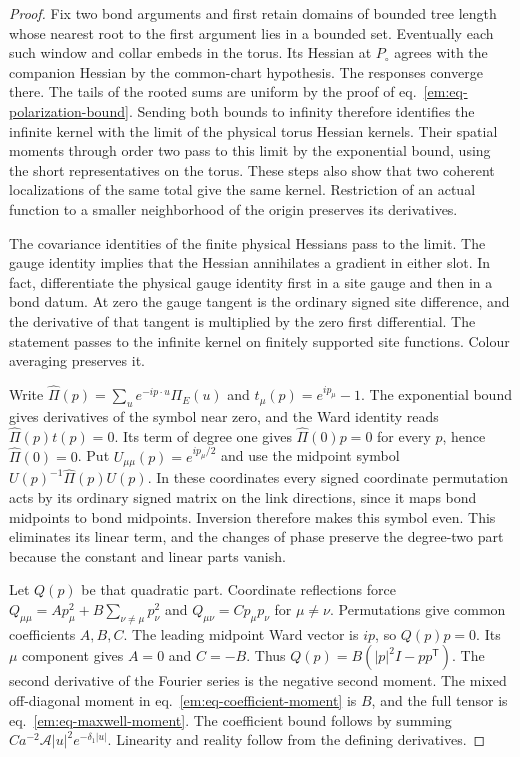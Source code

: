 \documentclass[11pt,letterpaper,reqno]{amsart}
\numberwithin{equation}{section}
\renewcommand{\eqref}[1]{\textup{eq.~\ref{#1}}}
\theoremstyle{definition}
\theoremstyle{remark}
\begin{document}
\begin{proof}
Fix two bond arguments and first retain domains of bounded tree
length whose nearest root to the first argument lies in a bounded
set. Eventually each such window and collar embeds in the torus.
Its Hessian at $P_\circ$ agrees with the companion Hessian by the
common-chart hypothesis. The responses converge there. The tails
of the rooted sums are uniform by the proof of
\eqref{em:eq-polarization-bound}. Sending both bounds to infinity
therefore identifies the infinite kernel with the limit of the
physical torus Hessian kernels. Their spatial moments through order
two pass to this limit by the exponential bound, using the short
representatives on the torus. These steps also show that two
coherent localizations of the same total give the same kernel.
Restriction of an actual function to a smaller neighborhood of the
origin preserves its derivatives.

The covariance identities of the finite physical Hessians pass to
the limit. The gauge identity implies that the Hessian annihilates
a gradient in either slot. In fact, differentiate the physical
gauge identity first in a site gauge and then in a bond datum.
At zero the gauge tangent is the ordinary signed site difference,
and the derivative of that tangent is multiplied by the zero first
differential. The statement passes to the infinite kernel on
finitely supported site functions. Colour averaging preserves it.

Write $\widehat\Pi(p)=\sum_u e^{-ip\cdot u}\Pi_E(u)$ and
$t_\mu(p)=e^{ip_\mu}-1$. The exponential bound gives derivatives of
the symbol near zero, and the Ward identity reads
$\widehat\Pi(p)t(p)=0$. Its term of degree one gives
$\widehat\Pi(0)p=0$ for every $p$, hence $\widehat\Pi(0)=0$.
Put $U_{\mu\mu}(p)=e^{ip_\mu/2}$ and use the midpoint symbol
$U(p)^{-1}\widehat\Pi(p)U(p)$. In these coordinates every signed
coordinate permutation acts by its ordinary signed matrix on the
link directions, since it maps bond midpoints to bond midpoints.
Inversion therefore makes this symbol even. This eliminates its
linear term, and the changes of phase preserve the degree-two
part because the constant and linear parts vanish.

Let $Q(p)$ be that quadratic part. Coordinate reflections force
$Q_{\mu\mu}=A p_\mu^2+B\sum_{\nu\ne\mu}p_\nu^2$ and
$Q_{\mu\nu}=C p_\mu p_\nu$ for $\mu\ne\nu$. Permutations give
common coefficients $A,B,C$. The leading midpoint Ward vector is
$ip$, so $Q(p)p=0$. Its $\mu$ component gives $A=0$ and $C=-B$.
Thus $Q(p)=B(|p|^2 I-pp^{\mathsf T})$. The second derivative of
the Fourier series is the negative second moment. The mixed
off-diagonal moment in \eqref{em:eq-coefficient-moment} is $B$,
and the full tensor is \eqref{em:eq-maxwell-moment}. The coefficient
bound follows by summing $C a^{-2}\mathcal A |u|^2e^{-\delta_1|u|}$.
Linearity and reality follow from the defining derivatives.
\end{proof}
\end{document}
